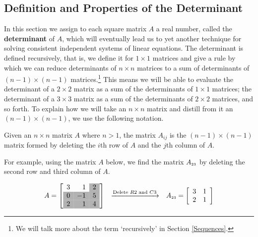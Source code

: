 

\setcounter{footnote}{0}

\label{Determinants}

\setlength{\extrarowheight}{0pt}

\subsection{Definition and Properties of the Determinant}

\label{determinantdefnandprops}

In this section we assign to each square matrix $A$ a real number, called the \textbf{determinant} of $A$, which will eventually lead us to yet another technique for solving consistent independent systems of linear equations.  The determinant is defined recursively, that is, we define it for $1 \times 1$ matrices and give a rule by which we can reduce determinants of $n \times n$ matrices to a sum of determinants of $(n-1) \times (n-1)$ matrices.\footnote{We will talk more about the term `recursively' in Section \ref{Sequences}.}  This means we will be able to evaluate the determinant of a $2 \times 2$ matrix as a sum of the determinants of $1 \times 1$ matrices;  the determinant of a $3 \times 3$ matrix as a sum of the determinants of $2 \times 2$ matrices, and so forth.  To explain how we will take an $n \times n$ matrix and distill from it an $(n-1) \times (n-1)$, we use the following notation.

\smallskip

\colorbox{ResultColor}{\bbm
\begin{defn} \label{Aijdefn} Given an $n \times n$ matrix $A$ where $n>1$, the matrix $A_{ij}$ is the $(n-1) \times (n-1)$ matrix formed by deleting the $i$th row of $A$ and the $j$th column of $A$. 
\end{defn}
\ebm}

\smallskip

For example, using the matrix $A$ below, we find the matrix $A_{\mbox{\tiny$23$}}$ by deleting the second row and third column of $A$.

\[ \begin{array}{ccc}

A = \left[ \begin{array}{rr>{\columncolor[gray]{0.7}}r} 3 &  1 & 2 \\ \rowcolor[gray]{0.7} 0 & -1 & 5 \\ 2 & 1 & 4 \\ \end{array} \right]
&
\xrightarrow{\text{Delete $R2$ and $C3$}}

&

A_{\mbox{\tiny$23$}} = \left[ \begin{array}{rr} 3 & 1 \\ 2 & 1 \\ \end{array} \right] \\

\end{array}\]

